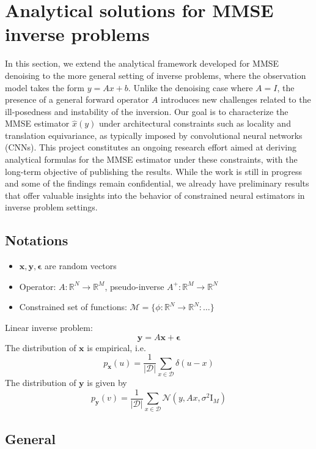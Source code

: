 \documentclass[a4paper,10pt]{article}
\theoremstyle{definition} %
\theoremstyle{definition} %
\theoremstyle{definition} %
\theoremstyle{definition} %
\newcommand{\R}{\mathbb{R}}
\newcommand{\Normal}[1]{\mathcal{N}\left( {#1} \right)}
\newcommand{\Id}{\mathrm{I}}
\newcommand{\M}{\mathcal{M}}
\newcommand{\x}{\boldsymbol{x}}
\newcommand{\beps}{\boldsymbol{\epsilon}}
\newcommand{\y}{\boldsymbol{y}}
\newcommand{\0}{\boldsymbol{0}}
\newcommand{\D}{\mathcal{D}}
\begin{document}
\section{Analytical solutions for MMSE inverse problems}
In this section, we extend the analytical framework developed for MMSE denoising to the more general setting of inverse problems, where the observation model takes the form $y=Ax+b$. Unlike the denoising case where $A=I$, the presence of a general forward operator $A$ introduces new challenges related to the ill-posedness and instability of the inversion. Our goal is to characterize the MMSE estimator $\hat{x}(y)$ under architectural constraints such as locality and translation equivariance, as typically imposed by convolutional neural networks (CNNs). This project constitutes an ongoing research effort aimed at deriving analytical formulas for the MMSE estimator under these constraints, with the long-term objective of publishing the results. While the work is still in progress and some of the findings remain confidential, we already have preliminary results that offer valuable insights into the behavior of constrained neural estimators in inverse problem settings.
\subsection{Notations}
\begin{itemize}
    \item[]  $\x, \y, \beps$ are random vectors 
    \item[] Operator: $A: \R^N \to \R^M$, pseudo-inverse $A^+ : \R^M \to \R^N$
    \item[] Constrained set of functions: $\M = \{ \phi : \R^N \to \R^N: \dots \}$
\end{itemize}
Linear inverse problem:
\begin{equation*}
   \y = A \x + \beps 
\end{equation*}
The distribution of $\x$ is empirical, i.e.
\begin{equation}
    p_{\x}(u) =  \frac{1}{|\D|}\sum_{x\in\D} \delta(u-x)
\end{equation}
The distribution of $\y$ is given by
\begin{equation*}
    p_{\y}(v) = \frac{1}{|\D|}\sum_{x\in\D} \Normal{y,Ax,\sigma^2\Id_M}
\end{equation*}

\subsection{General}
\end{document}
